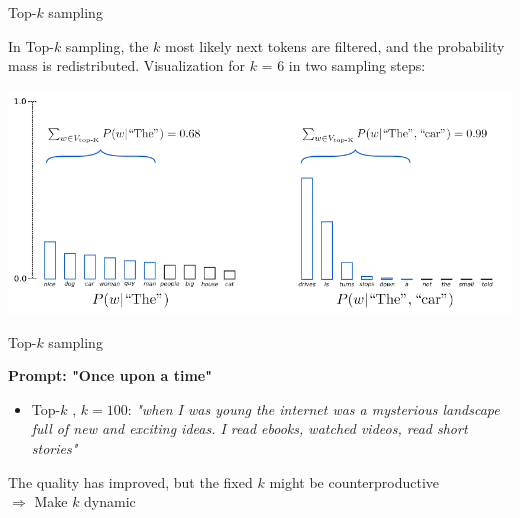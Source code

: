 \begin{vbframe}{Top-$k$ sampling}

In Top-$k$ sampling, the $k$ most likely next tokens are filtered, and the probability mass is redistributed.
Visualization for $k$ = 6 in two sampling steps:

\begin{center}
    \includegraphics[width=0.9\linewidth]{figure/top_k.png}
\end{center}


\end{vbframe}


\begin{vbframe}{Top-$k$ sampling}

\vfill

\textbf{Prompt: "Once upon a time"}
\begin{itemize}
    \item Top-$k$ , $k = 100$: \textit{"when I was young the internet was a mysterious landscape full of new and exciting ideas. I read ebooks, watched videos, read short stories"}
\end{itemize}
\vspace{2ex}

The quality has improved, but the fixed $k$ might be counterproductive\\
\vspace{2ex}
$\Rightarrow$ Make $k$ dynamic        


\end{vbframe}


